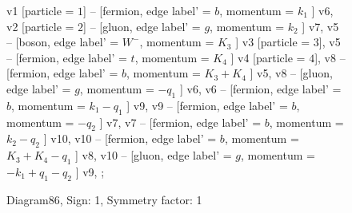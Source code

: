 \documentclass{revtex4}
\begin{document}
\begin{figure}[!htb]
\begin{center}
{    %
v1 [particle = \(1\)] -- [fermion, edge label' = \(b\), momentum = \(k_{1}\) ] v6, 
v2 [particle = \(2\)] -- [gluon, edge label' = \(g\), momentum = \(k_{2}\) ] v7, 
v5 -- [boson, edge label' = \(W^{-}\), momentum = \(K_{3}\) ] v3 [particle = \(3\)], 
v5 -- [fermion, edge label' = \(t\), momentum = \(K_{4}\) ] v4 [particle = \(4\)], 
v8 -- [fermion, edge label' = \(b\), momentum = \(K_{3} + K_{4}\) ] v5, 
v8 -- [gluon, edge label' = \(g\), momentum = \(-q_{1}\) ] v6, 
v6 -- [fermion, edge label' = \(b\), momentum = \(k_{1} - q_{1}\) ] v9, 
v9 -- [fermion, edge label' = \(b\), momentum = \(-q_{2}\) ] v7, 
v7 -- [fermion, edge label' = \(b\), momentum = \(k_{2} - q_{2}\) ] v10, 
v10 -- [fermion, edge label' = \(b\), momentum = \(K_{3} + K_{4} - q_{1}\) ] v8, 
v10 -- [gluon, edge label' = \(g\), momentum = \(-k_{1} + q_{1} - q_{2}\) ] v9, 
};
\end{center}
\caption{Diagram86, Sign: 1, Symmetry factor: 1}
\end{figure}
\newpage
\end{document}
